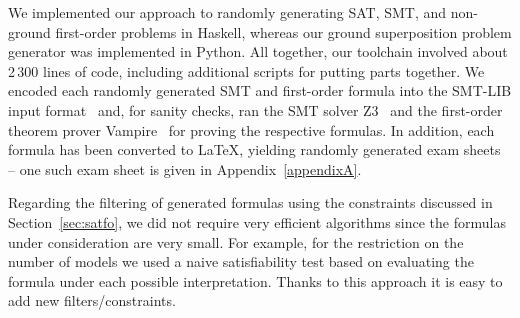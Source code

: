We implemented our approach to randomly generating
SAT, SMT, and non-ground first-order problems in Haskell, whereas
our ground superposition problem generator was implemented in
Python. All together, our toolchain involved about 2\,300 lines of code,
including additional scripts for putting parts together.
We encoded each randomly generated SMT and first-order formula into
the SMT-LIB input format~\cite{barrett2017smtlib} and, for sanity checks, ran the SMT
solver Z3~\cite{Z3}  and the first-order theorem prover
Vampire~\cite{Vampire13} for proving the respective formulas.
In addition, each formula has been converted  to \LaTeX{}, yielding
randomly generated exam sheets -- one such exam sheet is given in
Appendix~\ref{appendixA}. 

Regarding the filtering of generated formulas using the constraints discussed in Section~\ref{sec:satfo},
we did not require very efficient algorithms since the formulas under consideration are very small.
For example, for the restriction on the number of models we used a naive satisfiability test
based on evaluating the formula under each possible interpretation.
Thanks to this approach it is easy to add new filters/constraints.


